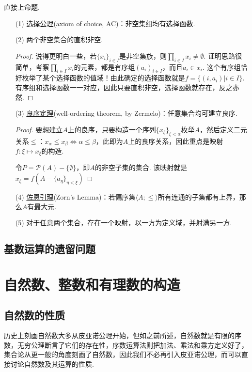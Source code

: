 \documentclass[main.tex]{subfiles}
\begin{document}
直接上命题.
\begin{itemize}
    \item [(1)] \uline{选择公理}(axiom of choice, AC)：非空集组均有选择函数.
    \item [(2)] 两个非空集合的直积非空.
    \begin{proof}
        说得更明白一些，若\(\{x_i\}_{i \in I}\)是非空集族，则\(\prod_{i \in I}x_i \neq \emptyset\). 证明思路很简单，考察\(\prod_{i \in I}x_i\)的元素，都是有序组\((a_i)_{i \in I}\)，而且\(a_i \in x_i\). 这个有序组恰好枚举了某个选择函数的值域！由此确定的选择函数就是\(f = \{(i,a_i)|i \in I\}\). 有序组和选择函数一一对应，因此只要直积非空，选择函数就存在，反之亦然.
    \end{proof}
    \item [(3)] \uline{良序定理}(well-ordering theorem, by Zermelo)：任意集合均可建立良序.
    \begin{proof}
        要想建立\(A\)上的良序，只要构造一个序列\(\{x_\xi\}_{\xi <\alpha}\)枚举\(A\)，然后定义二元关系\(\leq\)：\(x_\alpha \leq x_\beta \Leftrightarrow \alpha \leq \beta\)，此即为\(A\)上的良序关系，因此重点是映射\(f:\xi \mapsto x_\xi\)的构造. 

        令\(P = \mathcal{P}(A) - \{\emptyset\}\)，即\(A\)的非空子集的集合. 该映射就是\(x_\xi = f(A - \{a_\eta\}_{\eta<\xi})\)
    \end{proof}
    \item [(4)] \uline{佐恩引理}(Zorn's Lemma)：若偏序集\(\langle A; \leq \rangle\)所有连通的子集都有上界，那么\(A\)有最大元.
    \item [(5)] 对于任意两个集合，存在一个映射，以一方为定义域，并射满另一方.
\end{itemize}


\subsection{基数运算的遗留问题}

\section{自然数、整数和有理数的构造}

\subsection{自然数的性质}

历史上刻画自然数大多从皮亚诺公理开始，但如之前所述，自然数就是有限的序数，无穷公理断言了它们的存在性，序数运算法则把加法、乘法和乘方定义好了，集合论从更一般的角度刻画了自然数，因此我们不必再引入皮亚诺公理，而可以直接讨论自然数及其运算的性质.
\end{document}
